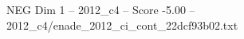 \begin{textsample}{NEG Dim 1 – 2012\_c4 – Score -5.00 – 2012\_c4/enade\_2012\_ci\_cont\_22dcf93b02.txt}
\end{textsample}
